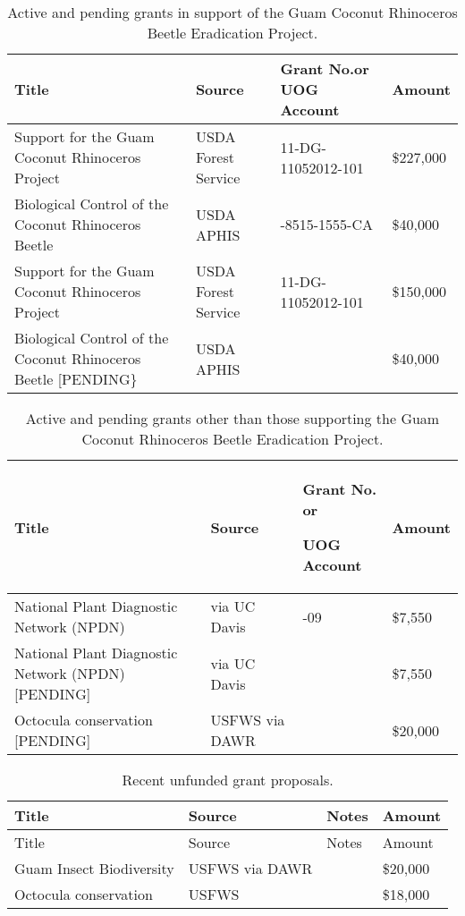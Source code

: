 \documentclass[12pt,oneside,english]{scrbook}
\begin{document}
\pagebreak{}

\begin{table}[p]
\protect\caption{\label{tab:crb_grants}Active and pending grants in support of the
Guam Coconut Rhinoceros Beetle Eradication Project.}

\centering{}%
\begin{tabular}{>{\raggedright}p{5cm}>{\centering}p{3cm}>{\centering}p{3cm}>{\raggedleft}p{2cm}}
\hline 
Title &
Source &
Grant No.or UOG Account &
Amount\tabularnewline
\hline 
\hline 
Support for the Guam Coconut Rhinoceros Project  &
USDA Forest Service &
{\small{}11-DG-11052012-101} &
\$227,000\tabularnewline
Biological Control of the Coconut Rhinoceros Beetle &
USDA APHIS &
12-8515-1555-CA &
\$40,000\tabularnewline
Support for the Guam Coconut Rhinoceros Project  &
USDA Forest Service &
{\small{}11-DG-11052012-101} &
\$150,000\tabularnewline
Biological Control of the Coconut Rhinoceros Beetle {[}PENDING\} &
USDA APHIS &
 &
\$40,000\tabularnewline
\hline 
\end{tabular}
\end{table}

\pagebreak{}

\begin{longtable}{>{\raggedright}p{2in}>{\centering}p{1.25in}>{\centering}p{1.25in}>{\raggedleft}p{0.75in}}
\caption{\label{tab:Grants-other-than-CRB}Active and pending grants other
than those supporting the Guam Coconut Rhinoceros Beetle Eradication
Project.}
\tabularnewline
\endfirsthead
\midrule 
Title &
Source &
Grant No. or

UOG Account &
Amount\tabularnewline
\midrule 
National Plant Diagnostic Network (NPDN) &
via UC Davis &
201223902-09 &
\$7,550\tabularnewline
\midrule 
National Plant Diagnostic Network (NPDN) {[}PENDING{]} &
via UC Davis &
 &
\$7,550\tabularnewline
\midrule 
Octocula conservation {[}PENDING{]} &
USFWS via DAWR &
 &
\$20,000\tabularnewline
\bottomrule
\end{longtable}

\pagebreak{}

\begin{longtable}{>{\raggedright}p{2in}>{\centering}p{1.25in}>{\centering}p{1.25in}>{\raggedleft}p{0.75in}}
\caption{\label{tab:Unfunded-grant-proposals.}Recent unfunded grant proposals.}
\tabularnewline
\midrule 
Title &
Source &
Notes &
Amount\tabularnewline
\endfirsthead
\midrule 
Title &
Source &
Notes &
Amount\tabularnewline
\endhead
\midrule 
Guam Insect Biodiversity &
USFWS via DAWR &
 &
\$20,000\tabularnewline
\midrule 
Octocula conservation &
USFWS &
 &
\$18,000\tabularnewline
\bottomrule
\end{longtable}
\end{document}
